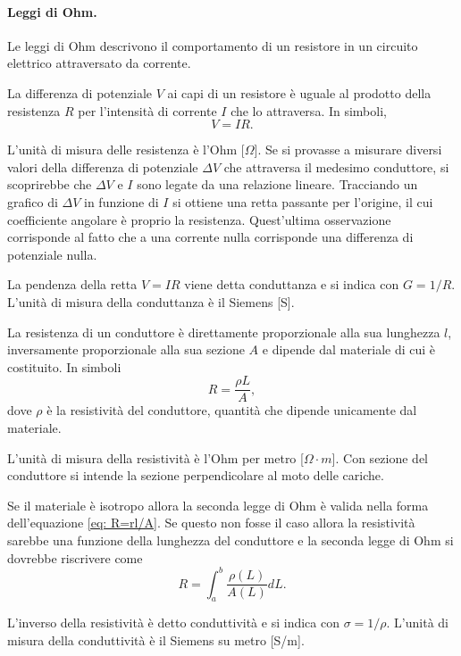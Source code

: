 \paragraph{Leggi di Ohm.} Le leggi di Ohm descrivono il comportamento di un resistore in un circuito elettrico attraversato da corrente.
\begin{axiom}
    \label{ax:prima legge di ohm}
    La differenza di potenziale $V$ ai capi di un resistore è uguale al prodotto della resistenza $R$ per l'intensità di corrente $I$ che lo attraversa. In simboli,
    \begin{equation}
    \label{eq: VIR}
        V=IR.
    \end{equation}
\end{axiom}
L'unità di misura delle resistenza è l'Ohm [$\Omega$]. Se si provasse a misurare diversi valori della differenza di potenziale $\Delta V$ che attraversa il medesimo conduttore, si scoprirebbe che $\Delta V$ e $I$ sono legate da una relazione lineare. Tracciando un grafico di $\Delta V$ in funzione di $I$ si ottiene una retta passante per l'origine, il cui coefficiente angolare è proprio la resistenza. Quest'ultima osservazione corrisponde al fatto che a una corrente nulla corrisponde una differenza di potenziale nulla.
\begin{obs}
    La pendenza della retta $V=IR$ viene detta conduttanza e si indica con $G=1/R$. L'unità di misura della conduttanza è il Siemens [S].
\end{obs}
\begin{axiom}
    \label{ax: seconda legge di ohm}
    La resistenza di un conduttore è direttamente proporzionale alla sua lunghezza $l$, inversamente proporzionale alla sua sezione $A$ e dipende dal materiale di cui è costituito. In simboli
    \begin{equation}
        \label{eq: R=rl/A}
        R=\frac{\rho L}{A},
    \end{equation}
    dove $\rho$ è la resistività del conduttore, quantità che dipende unicamente dal materiale.
\end{axiom}
L'unità di misura della resistività è l'Ohm per metro [$\Omega\cdot m$]. Con sezione del conduttore si intende la sezione perpendicolare al moto delle cariche. 
\begin{obs}
    Se il materiale è isotropo allora la seconda legge di Ohm è valida nella forma dell'equazione \eqref{eq: R=rl/A}. Se questo non fosse il caso allora la resistività sarebbe una funzione della lunghezza del conduttore e la seconda legge di Ohm si dovrebbe riscrivere come 
    \begin{equation}
        R=\int_{a}^{b}\frac{\rho(L)}{A(L)}dL.
    \end{equation}
\end{obs}
\begin{obs}
    L'inverso della resistività è detto conduttività e si indica con $\sigma=1/\rho$. L'unità di misura della conduttività è il Siemens su metro [S/m].
\end{obs}
